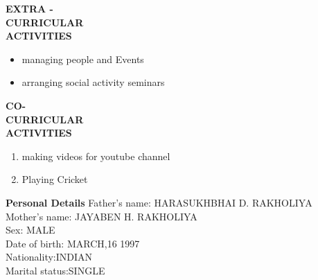 \documentclass{article}
\begin{document}
 	\begin{flushleft} 
 		
 		
 		
 		\vspace{0.4in}
 		\textbf{EXTRA - \\CURRICULAR \\ACTIVITIES }
 		\begin{itemize}
 			\vspace{-0.65in}
 			\addtolength{\itemindent}{1.359in}
 			\item  managing people and Events
 			\item  arranging social activity seminars
 			
 		\end{itemize}
 	\end{flushleft}

 \begin{flushleft} 
 	\vspace{0.4in}
 	\textbf{CO- \\CURRICULAR \\ACTIVITIES }
 	\begin{enumerate}
 		\vspace{-0.65in}
 		\addtolength{\itemindent}{1.359in}
 		\item  making videos for youtube channel 
 		\item  Playing Cricket
 		
 	\end{enumerate}
 \end{flushleft}


\begin{flushleft}
	\vspace{0.4in}
	\textbf{Personal Details} \hspace{0.36in}Father's name: \hspace{0.13in} HARASUKHBHAI D. RAKHOLIYA \\
	\hspace{1.55in}Mother's name: \hspace{0.08in} JAYABEN H. RAKHOLIYA\\
	\hspace{1.55in}Sex:\hspace{0.85in} MALE\\
	\hspace{1.55in}Date of birth:\hspace{0.255in} MARCH,16 1997	\\
	\hspace{1.55in}Nationality:\hspace{0.45in}INDIAN\\
	\hspace{1.55in}Marital status:\hspace{0.28in}SINGLE
	
\end{flushleft}
\end{document}
